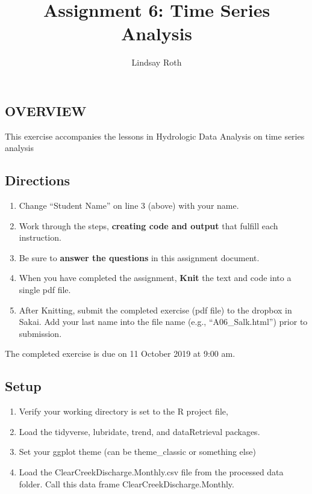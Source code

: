 \documentclass[]{article}
\title{Assignment 6: Time Series Analysis}
\author{Lindsay Roth}
\date{}
\providecommand{\tightlist}{%
  \setlength{\itemsep}{0pt}\setlength{\parskip}{0pt}}
\begin{document}
\maketitle

\hypertarget{overview}{%
\subsection{OVERVIEW}\label{overview}}

This exercise accompanies the lessons in Hydrologic Data Analysis on
time series analysis

\hypertarget{directions}{%
\subsection{Directions}\label{directions}}

\begin{enumerate}
\def\labelenumi{\arabic{enumi}.}
\tightlist
\item
  Change ``Student Name'' on line 3 (above) with your name.
\item
  Work through the steps, \textbf{creating code and output} that fulfill
  each instruction.
\item
  Be sure to \textbf{answer the questions} in this assignment document.
\item
  When you have completed the assignment, \textbf{Knit} the text and
  code into a single pdf file.
\item
  After Knitting, submit the completed exercise (pdf file) to the
  dropbox in Sakai. Add your last name into the file name (e.g.,
  ``A06\_Salk.html'') prior to submission.
\end{enumerate}

The completed exercise is due on 11 October 2019 at 9:00 am.

\hypertarget{setup}{%
\subsection{Setup}\label{setup}}

\begin{enumerate}
\def\labelenumi{\arabic{enumi}.}
\tightlist
\item
  Verify your working directory is set to the R project file,
\item
  Load the tidyverse, lubridate, trend, and dataRetrieval packages.
\item
  Set your ggplot theme (can be theme\_classic or something else)
\item
  Load the ClearCreekDischarge.Monthly.csv file from the processed data
  folder. Call this data frame ClearCreekDischarge.Monthly.
\end{enumerate}
\end{document}
